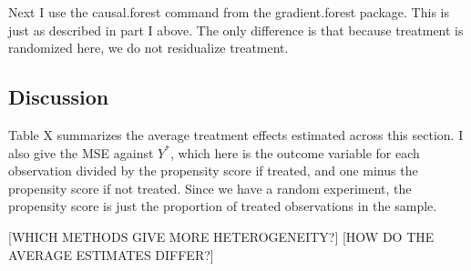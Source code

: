 \documentclass[paper=letter, fontsize=11pt]{scrartcl} %
\begin{document}
Next I use the causal.forest command from the gradient.forest package. This is just as described in part I above. The only difference is that because treatment is randomized here, we do not residualize treatment. 

\subsection{Discussion}

Table X summarizes the average treatment effects estimated across this section. I also give the MSE against $Y^*$, which here is the outcome variable for each observation divided by the propensity score if treated, and one minus the propensity score if not treated. Since we have a random experiment, the propensity score is just the proportion of treated observations in the sample.

[WHICH METHODS GIVE MORE HETEROGENEITY?] [HOW DO THE AVERAGE ESTIMATES DIFFER?]
\end{document}
